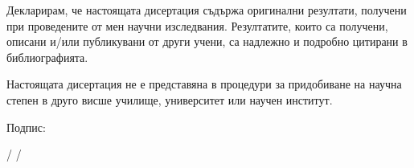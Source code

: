 \documentclass[12pt,bulgarian,singlespacing,headsepline,oneside,openany]{IICTBASDoctoralThesis}
\begin{document}

\begin{declaration}

\vspace{2cm}

Декларирам, че настоящата дисертация съдържа оригинални резултати, получени при проведените от мен научни изследвания. Резултатите, които са получени, описани и/или публикувани от други учени, са надлежно и подробно цитирани в библиографията.

\vspace{0.5cm}

Настоящата дисертация не е представяна в процедури за придобиване на научна степен в друго висше училище, университет или научен институт.

\vspace{2cm}

\hspace{4cm}
Подпис: 

\vspace{0.25cm}

\hspace{5cm}
/ \aname /
\end{declaration}


\newpage
\tableofcontents


\newpage
\listoffigures


\newpage
\listoftables

\end{document}
